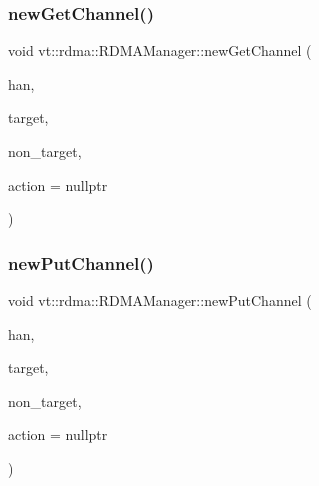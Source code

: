 \subsubsection{\texorpdfstring{new\+Get\+Channel()}{newGetChannel()}\hspace{0.1cm}{\footnotesize\ttfamily [2/2]}}
{\footnotesize\ttfamily void vt\+::rdma\+::\+R\+D\+M\+A\+Manager\+::new\+Get\+Channel (\begin{DoxyParamCaption}\item[{\hyperlink{namespacevt_a10442579ec4e7ebef223818e64bcf908}{R\+D\+M\+A\+\_\+\+Handle\+Type} const \&}]{han,  }\item[{\hyperlink{namespacevt_a866da9d0efc19c0a1ce79e9e492f47e2}{Node\+Type} const \&}]{target,  }\item[{\hyperlink{namespacevt_a866da9d0efc19c0a1ce79e9e492f47e2}{Node\+Type} const \&}]{non\+\_\+target,  }\item[{\hyperlink{namespacevt_ae0a5a7b18cc99d7b732cb4d44f46b0f3}{Action\+Type} const \&}]{action = {\ttfamily nullptr} }\end{DoxyParamCaption})\hspace{0.3cm}{\ttfamily [inline]}}

\mbox{\label{structvt_1_1rdma_1_1_r_d_m_a_manager_ae64c8e90dc45fcd44129e4c62f3b65ea}} 
\subsubsection{\texorpdfstring{new\+Put\+Channel()}{newPutChannel()}}
{\footnotesize\ttfamily void vt\+::rdma\+::\+R\+D\+M\+A\+Manager\+::new\+Put\+Channel (\begin{DoxyParamCaption}\item[{\hyperlink{namespacevt_a10442579ec4e7ebef223818e64bcf908}{R\+D\+M\+A\+\_\+\+Handle\+Type} const \&}]{han,  }\item[{\hyperlink{namespacevt_a866da9d0efc19c0a1ce79e9e492f47e2}{Node\+Type} const \&}]{target,  }\item[{\hyperlink{namespacevt_a866da9d0efc19c0a1ce79e9e492f47e2}{Node\+Type} const \&}]{non\+\_\+target,  }\item[{\hyperlink{namespacevt_ae0a5a7b18cc99d7b732cb4d44f46b0f3}{Action\+Type} const \&}]{action = {\ttfamily nullptr} }\end{DoxyParamCaption})\hspace{0.3cm}{\ttfamily [inline]}}

